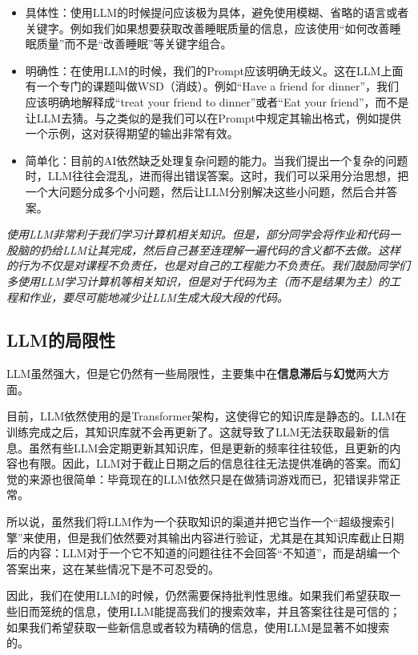 \documentclass[../main.tex]{subfiles}
\begin{document}
\begin{itemize}
  \item 具体性：使用LLM的时候提问应该极为具体，避免使用模糊、省略的语言或者关键字。例如我们如果想要获取改善睡眠质量的信息，应该使用“如何改善睡眠质量”而不是“改善睡眠”等关键字组合。
  \item 明确性：在使用LLM的时候，我们的Prompt应该明确无歧义。这在LLM上面有一个专门的课题叫做WSD（消歧）。例如“Have a friend for dinner”，我们应该明确地解释成“treat your friend to dinner”或者“Eat your friend”，而不是让LLM去猜。与之类似的是我们可以在Prompt中规定其输出格式，例如提供一个示例，这对获得期望的输出非常有效。
  \item 简单化：目前的AI依然缺乏处理复杂问题的能力。当我们提出一个复杂的问题时，LLM往往会混乱，进而得出错误答案。这时，我们可以采用分治思想，把一个大问题分成多个小问题，然后让LLM分别解决这些小问题，然后合并答案。
\end{itemize}

\emph{使用LLM非常利于我们学习计算机相关知识。但是，部分同学会将作业和代码一股脑的扔给LLM让其完成，然后自己甚至连理解一遍代码的含义都不去做。这样的行为不仅是对课程不负责任，也是对自己的工程能力不负责任。我们鼓励同学们多使用LLM学习计算机等相关知识，但是对于代码为主（而不是结果为主）的工程和作业，要尽可能地减少让LLM生成大段大段的代码。}

\subsection{LLM的局限性}

LLM虽然强大，但是它仍然有一些局限性，主要集中在\textbf{信息滞后}与\textbf{幻觉}两大方面。

目前，LLM依然使用的是Transformer架构，这使得它的知识库是静态的。LLM在训练完成之后，其知识库就不会再更新了。这就导致了LLM无法获取最新的信息。虽然有些LLM会定期更新其知识库，但是更新的频率往往较低，且更新的内容也有限。因此，LLM对于截止日期之后的信息往往无法提供准确的答案。而幻觉的来源也很简单：毕竟现在的LLM依然只是在做猜词游戏而已，犯错误非常正常。

所以说，虽然我们将LLM作为一个获取知识的渠道并把它当作一个“超级搜索引擎”来使用，但是我们依然要对其输出内容进行验证，尤其是在其知识库截止日期后的内容：LLM对于一个它不知道的问题往往不会回答“不知道”，而是胡编一个答案出来，这在某些情况下是不可忍受的。

因此，我们在使用LLM的时候，仍然需要保持批判性思维。如果我们希望获取一些旧而笼统的信息，使用LLM能提高我们的搜索效率，并且答案往往是可信的；如果我们希望获取一些新信息或者较为精确的信息，使用LLM是显著不如搜索的。
\end{document}
